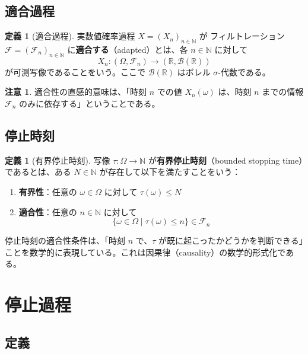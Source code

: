\documentclass[a4paper,12pt]{ltjsarticle}
\theoremstyle{definition}
\newtheorem{definition}[theorem]{定義}
\newtheorem{remark}[theorem]{注意}
\newcommand{\R}{\mathbb{R}}
\newcommand{\N}{\mathbb{N}}
\newcommand{\F}{\mathcal{F}}
\begin{document}
\subsection{適合過程}

\begin{definition}[適合過程]
実数値確率過程 $X = (X_n)_{n \in \N}$ が フィルトレーション $\F = (\F_n)_{n \in \N}$ に\textbf{適合する}（adapted）とは、各 $n \in \N$ に対して
\[
X_n : (\Omega, \F_n) \to (\R, \mathcal{B}(\R))
\]
が可測写像であることをいう。ここで $\mathcal{B}(\R)$ はボレル $\sigma$-代数である。
\end{definition}

\begin{remark}
適合性の直感的意味は、「時刻 $n$ での値 $X_n(\omega)$ は、時刻 $n$ までの情報 $\F_n$ のみに依存する」ということである。
\end{remark}

\subsection{停止時刻}

\begin{definition}[有界停止時刻]
写像 $\tau : \Omega \to \N$ が\textbf{有界停止時刻}（bounded stopping time）であるとは、ある $N \in \N$ が存在して以下を満たすことをいう：
\begin{enumerate}
\item \textbf{有界性}：任意の $\omega \in \Omega$ に対して $\tau(\omega) \leq N$
\item \textbf{適合性}：任意の $n \in \N$ に対して
\[
\{\omega \in \Omega \mid \tau(\omega) \leq n\} \in \F_n
\]
\end{enumerate}
\end{definition}

\begin{keyidea}[停止時刻の本質]
停止時刻の適合性条件は、「時刻 $n$ で、$\tau$ が既に起こったかどうかを判断できる」ことを数学的に表現している。これは因果律（causality）の数学的形式化である。
\end{keyidea}

\section{停止過程}

\subsection{定義}
\end{document}
